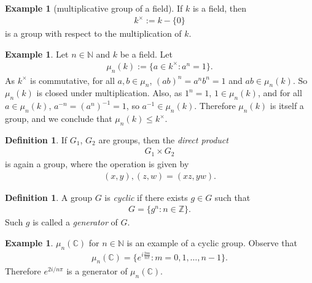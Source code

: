 \documentclass[12pt]{report}
\theoremstyle{plain}
\theoremstyle{remark}
\theoremstyle{definition}
\newtheorem{definition}[theorem]{Definition}
\newtheorem{example}[theorem]{Example}
\newcommand{\N}{\mathbb{N}}
\newcommand{\Z}{\mathbb{Z}}
\newcommand{\C}{\mathbb{C}}
\begin{document}
\begin{example}[multiplicative group of a field]
    If $k$ is a field, then
    \begin{align*}
        k^\times := k-\{0\}
    \end{align*}
    is a group with respect to the multiplication of $k$. 
\end{example}

\begin{example}
    Let $n\in\N$ and $k$ be a field. Let
    \begin{align*}
        \mu_n(k):=\{a\in k^\times:a^n=1\}.
    \end{align*}
    As $k^\times$ is commutative, for all $a,b\in \mu_n$, $(ab)^n = a^n b^n =1$ and $ab\in\mu_n(k)$. So $\mu_n(k)$ is closed under multiplication. Also, as $1^n=1$, $1\in \mu_n(k)$, and for all $a\in \mu_n(k)$, $a^{-n}=(a^n)^{-1}=1$, so $a^{-1}\in\mu_n(k)$. Therefore $\mu_n(k)$ is itself a group, and we conclude that $\mu_n(k)\le k^\times$.
\end{example}

\begin{definition}
    If $G_1$, $G_2$ are groups, then the \emph{direct product}
    \begin{align*}
        G_1\times G_2
    \end{align*}
    is again a group, where the operation is given by
    \begin{align*}
        (x,y),(z,w)=(xz,yw).
    \end{align*}
\end{definition}

\begin{definition}
    A group $G$ is \emph{cyclic} if there exists $g\in G$ such that
    \begin{align*}
        G=\{g^n:n\in\Z\}.
    \end{align*}
    Such $g$ is called a \emph{generator} of $G$.
\end{definition}

\begin{example}
    $\mu_n(\C)$ for $n\in\N$ is an example of a cyclic group. Observe that
    \begin{align*}
        \mu_n(\C) = \{e^{i\frac{2m}{n\pi}}:m=0,1,\dots,n-1\}.
    \end{align*}
    Therefore $e^{2i/n\pi}$ is a generator of $\mu_n(\C)$.
\end{example}
\end{document}
